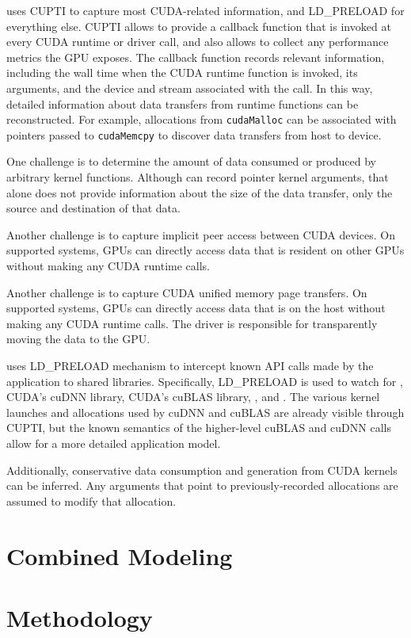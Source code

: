  uses CUPTI to capture most CUDA-related information, and LD\_PRELOAD for everything else.
CUPTI allows  to provide a callback function that is invoked at every CUDA runtime or driver call, and also allows  to collect any performance metrics the GPU exposes.
The callback function records relevant information, including the wall time when the CUDA runtime function is invoked, its arguments, and the device and stream associated with the call.
In this way, detailed information about data transfers from runtime functions can be reconstructed.
For example, allocations from \texttt{cudaMalloc} can be associated with pointers passed to \texttt{cudaMemcpy} to discover data transfers from host to device.

One challenge is to determine the amount of data consumed or produced by arbitrary kernel functions.
Although  can record pointer kernel arguments, that alone does not provide information about the size of the data transfer, only the source and destination of that data.

Another challenge is to capture implicit peer access between CUDA devices.
On supported systems, GPUs can directly access data that is resident on other GPUs without making any CUDA runtime calls.

Another challenge is to capture CUDA unified memory page transfers.
On supported systems, GPUs can directly access data that is on the host without making any CUDA runtime calls.
The driver is responsible for transparently moving the data to the GPU.


 uses LD\_PRELOAD mechanism to intercept known API calls made by the application to shared libraries.
Specifically, LD\_PRELOAD is used to watch for , CUDA's cuDNN library, CUDA's cuBLAS library, , and .
The various kernel launches and allocations used by cuDNN and cuBLAS are already visible through CUPTI, but the known semantics of the higher-level cuBLAS and cuDNN calls allow for a more detailed application model.


Additionally, conservative data consumption and generation from CUDA kernels can be inferred.
Any arguments that point to previously-recorded allocations are assumed to modify that allocation.



\section{Combined Modeling}
\label{sec:modeling}

\section{Methodology}
